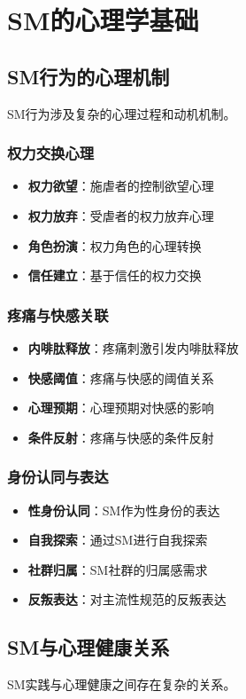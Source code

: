\documentclass[12pt,UTF8]{ctexbook}
\begin{document}
\chapter{SM的心理学基础}
\section{SM行为的心理机制}
SM行为涉及复杂的心理过程和动机机制。

\subsection{权力交换心理}
\begin{itemize}[leftmargin=2cm]
	\item \textbf{权力欲望}：施虐者的控制欲望心理
	\item \textbf{权力放弃}：受虐者的权力放弃心理
	\item \textbf{角色扮演}：权力角色的心理转换
	\item \textbf{信任建立}：基于信任的权力交换
\end{itemize}

\subsection{疼痛与快感关联}
\begin{itemize}[leftmargin=2cm]
	\item \textbf{内啡肽释放}：疼痛刺激引发内啡肽释放
	\item \textbf{快感阈值}：疼痛与快感的阈值关系
	\item \textbf{心理预期}：心理预期对快感的影响
	\item \textbf{条件反射}：疼痛与快感的条件反射
\end{itemize}

\subsection{身份认同与表达}
\begin{itemize}[leftmargin=2cm]
	\item \textbf{性身份认同}：SM作为性身份的表达
	\item \textbf{自我探索}：通过SM进行自我探索
	\item \textbf{社群归属}：SM社群的归属感需求
	\item \textbf{反叛表达}：对主流性规范的反叛表达
\end{itemize}

\section{SM与心理健康关系}
SM实践与心理健康之间存在复杂的关系。
\end{document}
